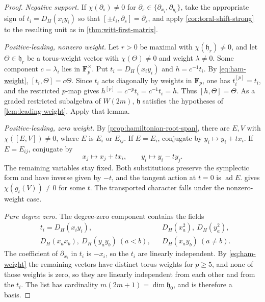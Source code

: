 \documentclass[11pt,reqno]{amsart}
\theoremstyle{definition}
\theoremstyle{remark}
\theoremstyle{definition}
\newcommand{\Fp}{\mathbf F_p}
\begin{document}
\begin{proof}
\emph{Negative support.} If $\chi(\partial_s)\ne0$ for $\partial_s\in
\{\partial_{x_i},\partial_{y_i}\}$, take the appropriate sign of
$t_i=D_H(x_iy_i)$ so that $[\pm t_i,\partial_s]=\partial_s$, and apply
\cref{cor:toral-shift-strong} to the resulting unit as in
\cref{thm:witt-first-matrix}.

\emph{Positive-leading, nonzero weight.} Let $r>0$ be maximal with
$\chi(\mathfrak h_r)\ne0$, and let $\Theta\in\mathfrak h_r$ be a
torus-weight vector with $\chi(\Theta)\ne0$ and weight $\lambda\ne0$.
Some component $c=\lambda_i$ lies in $\Fp^\times$.  Put
$t_i=D_H(x_iy_i)$ and $h=c^{-1}t_i$.  By \eqref{eq:ham-weight},
$[t_i,\Theta]=c\Theta$.  Since $t_i$ acts diagonally by weights in
$\Fp$, one has $t_i^{[p]}=t_i$, and the restricted $p$-map gives
$h^{[p]}=c^{-p}t_i=c^{-1}t_i=h$.  Thus $[h,\Theta]=\Theta$.
As a graded restricted subalgebra of $W(2m)$, $\mathfrak h$ satisfies
the hypotheses of \cref{lem:leading-weight}.  Apply that lemma.

\emph{Positive-leading, zero weight.}
By \cref{prop:hamiltonian-root-span}, there are $E,V$ with
$\chi([E,V])\ne0$, where $E$ is $E_i$ or $E_{ij}$.
If $E=E_i$, conjugate by $y_i\mapsto y_i+tx_i$.
If $E=E_{ij}$, conjugate by
\[
 x_j\mapsto x_j+tx_i,\qquad y_i\mapsto y_i-ty_j.
\]
The remaining variables stay fixed.  Both substitutions preserve the
symplectic form and have inverse given by $-t$, and the tangent action
at $t=0$ is $\operatorname{ad}E$.   gives
$\chi(g_t(V))\ne0$ for some $t$.  The transported character falls under
the nonzero-weight case.

\emph{Pure degree zero.}
The degree-zero component contains the fields
\begin{equation}\label{eq:ham-zero-basis}
\begin{aligned}
&t_i=D_H(x_iy_i),
&&D_H(x_a^2),\ D_H(y_a^2),\\
&D_H(x_ax_b),\ D_H(y_ay_b)\ (a<b),
&&D_H(x_ay_b)\ (a\ne b).
\end{aligned}
\end{equation}
The coefficient of $\partial_{x_i}$ in $t_i$ is $-x_i$, so the $t_i$ are
linearly independent.  By \eqref{eq:ham-weight} the remaining vectors have
distinct torus weights for $p\ge5$, and none of those weights is zero, so
they are linearly independent from each other and from the $t_i$.  The list
has cardinality $m(2m+1)=\dim\mathfrak h_0$, and is therefore a basis.


\end{proof}
\end{document}
